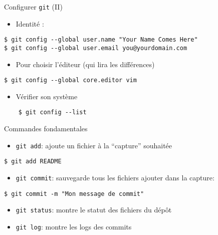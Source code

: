 \documentclass[unknownkeysallowed]{beamer}
\begin{document}
\begin{frame}[fragile]{Configurer \texttt{git} (II)}

\begin{itemize}
  \item Identité :
\end{itemize}
\begin{lstlisting}
$ git config --global user.name "Your Name Comes Here"
$ git config --global user.email you@yourdomain.com
\end{lstlisting}

\begin{itemize}
  \item Pour choisir l'éditeur (qui lira les différences)
\end{itemize}

\begin{lstlisting}
$ git config --global core.editor vim\end{lstlisting}

\begin{itemize}
  \item Vérifier son système
\end{itemize}

\begin{lstlisting}
    $ git config --list
\end{lstlisting}


\end{frame}



\begin{frame}[fragile]{Commandes fondamentales}

\begin{itemize}
  \item \lstinline[basicstyle =\ttfamily]+git add+: ajoute un fichier à la ``capture'' souhaitée
\end{itemize}
\begin{lstlisting}
$ git add README
\end{lstlisting}

\begin{itemize}
  \item \lstinline[basicstyle =\ttfamily]+git commit+: sauvegarde tous les fichiers ajouter dans la capture:
\end{itemize}

\begin{lstlisting}
$ git commit -m "Mon message de commit"
\end{lstlisting}
\begin{itemize}
  \item \lstinline[basicstyle =\ttfamily]+git status+: montre le statut des fichiers du dépôt
  \item \lstinline[basicstyle =\ttfamily]+git log+: montre les logs des commits
\end{itemize}
\end{frame}
\end{document}

